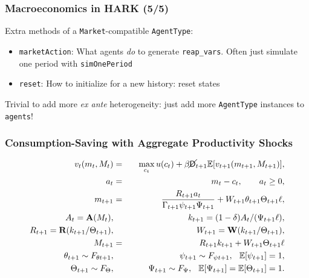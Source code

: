 \documentclass[public]{beamer}\beamerdefaultoverlayspecification{<+->}
\begin{document}
\begin{frame}
  \frametitle{Macroeconomics in HARK (5/5)}
  Extra methods of a \texttt{Market}-compatible \texttt{AgentType}:
  \begin{itemize}
  \item \texttt{marketAction}: What agents \textit{do} to generate \texttt{reap\_vars}.  Often just simulate one period with \texttt{simOnePeriod}

  \item \texttt{reset}: How to initialize for a new history: reset states
  \end{itemize}

  Trivial to add more \textit{ex ante} heterogeneity: just add more \texttt{AgentType} instances to \texttt{agents}!
\end{frame}



\begin{frame}
  \frametitle{Consumption-Saving with Aggregate Productivity Shocks}
  \begin{eqnarray*}
    v_t(m_t,M_t) &=& \max_{c_t} u(c_t) + \beta \cancel{\mathsf{D}}_{t+1} \mathbb{E} [v_{t+1}(m_{t+1},M_{t+1}) ], \\
    a_t &=& m_t - c_t, \qquad a_t \geq 0, \\
    m_{t+1} &=& \frac{R_{t+1} a_t}{\Gamma_{t+1}\psi_{t+1} \Psi_{t+1}}  + W_{t+1} \theta_{t+1} \Theta_{t+1} \ell, \\
    A_t = \textbf{A}({M_t}),  & & k_{t+1} = (1-\delta)A_t/(\Psi_{t+1} \ell), \\
    R_{t+1} = \textbf{R}(k_{t+1}/\Theta_{t+1}), & & W_{t+1} = \textbf{W}(k_{t+1}/\Theta_{t+1}), \\
    M_{t+1} &=& R_{t+1} k_{t+1} + W_{t+1} \Theta_{t+1} \ell \\
    \theta_{t+1} \sim F_{\theta t+1}, &\qquad& \psi_{t+1} \sim F_{\psi t+1}, \hspace{0.25cm} \mathbb{E}[\psi_{t+1}] = 1, \\
    \Theta_{t+1} \sim F_{\Theta}, &\qquad& \Psi_{t+1} \sim F_{\Psi}, \hspace{0.25cm} \mathbb{E}[\Psi_{t+1}] = \mathbb{E}[\Theta_{t+1}] = 1.
  \end{eqnarray*}
\end{frame}
\end{document}
